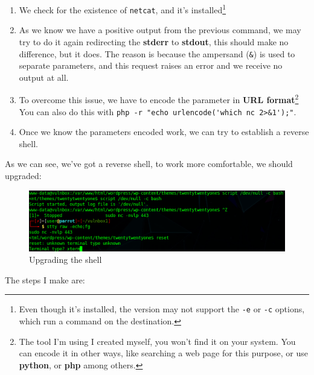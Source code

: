 \documentclass[12pt]{article}
\begin{document}
    \begin{enumerate}
        \item We check for the existence of \texttt{netcat}, and it's
            installed\footnote{Even though it's installed, the version may not
            support the \texttt{-e} or \texttt{-c} options, which run a command
            on the destination.}
        \item As we know we have a positive output from the previous command,
            we may try to do it again redirecting the \textbf{stderr} to
            \textbf{stdout}, this should make no difference, but it does. The
            reason is because the ampersand (\verb!&!) is used to separate
            parameters, and this request raises an error and we receive no
            output at all.
        \item To overcome this issue, we have to encode the parameter in
            \textbf{URL format}\footnote{The tool I'm using I created myself,
            you won't find it on your system. You can encode it in other ways,
            like searching a web page for this purpose, or use \textbf{python},
            or \textbf{php} among others.}
            You can also do this with\newline
            \verb!php -r "echo urlencode('which nc 2>&1');"!.
        \item Once we know the parameters encoded work, we can try to establish
            a reverse shell.
    \end{enumerate}

    As we can see, we've got a reverse shell, to work more comfortable, we
    should upgraded:

    \begin{figure}[H]\label{pic:38-upgrading-shell}
        \centering
        \includegraphics[width=1.00\textwidth]{38-upgrading-shell.png}
        \caption{Upgrading the shell}
    \end{figure}

    The steps I make are:
\end{document}

